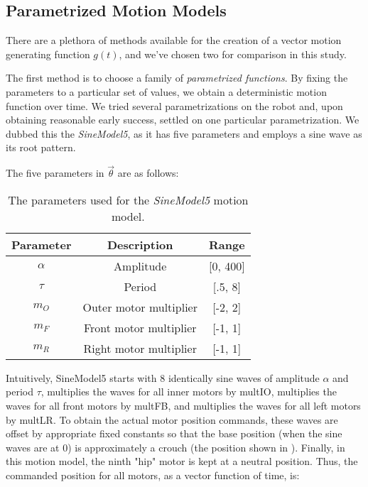 \subsection{Parametrized Motion Models}

 There are a plethora of methods
available for the creation of a vector motion generating function
$g(t)$, and we've chosen two for comparison in this study.

The first method is to choose a family of \emph{parametrized
  functions}.  By fixing the parameters to a particular set of values,
we obtain a deterministic motion function over time.  We tried several
parametrizations on the robot and, upon obtaining reasonable early
success, settled on one particular parametrization.  We dubbed this
the \emph{SineModel5}, as it has five parameters and employs a sine
wave as its root pattern.

The five parameters in $\vec{\theta}$ are as follows:

\newcommand{\amp}{\ensuremath{\alpha}}

\begin{table}[h]
\begin{center}
\begin{tabular}{|c|c|c|}
\hline
Parameter    & Description               & Range \\
\hline
\hline
\amp         & Amplitude                 & [0, 400] \\
\hline
$\tau$       & Period                    & [.5, 8] \\
\hline
$m_O$        & Outer motor multiplier    & [-2, 2] \\
\hline
$m_F$        & Front motor multiplier    & [-1, 1] \\
\hline
$m_R$        & Right motor multiplier    & [-1, 1] \\
\hline
\end{tabular}
\caption{The parameters used for the \emph{SineModel5} motion model.}
\end{center}
\end{table}


Intuitively, SineModel5 starts with 8 identically sine waves of
amplitude $\amp$ and period $\tau$, multiplies the waves for all inner
motors by multIO, multiplies the waves for all front motors by multFB,
and multiplies the waves for all left motors by multLR.  To obtain the
actual motor position commands, these waves are offset by
appropriate fixed constants so that the base position (when the sine
waves are at 0) is approximately a crouch (the position shown in
).  Finally, in this motion model, the ninth
"hip" motor is kept at a neutral position.  Thus, the commanded
position for all motors, as a vector function of time, is:

